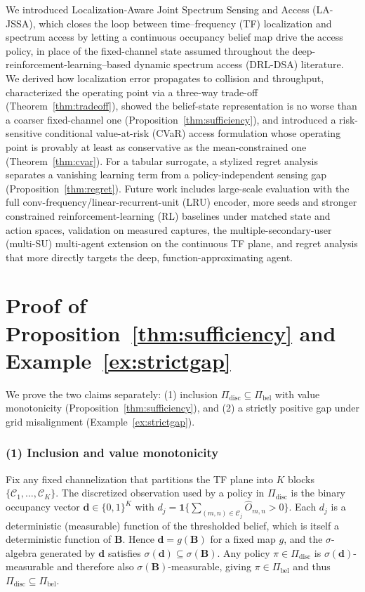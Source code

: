 \documentclass[journal]{IEEEtran}
\newcommand{\Ind}{\mathbf{1}}             %
\newcommand{\cell}{(m,n)}                  %
\newcommand{\occ}{O}                       %
\newcommand{\belmap}{\bm{B}}               %
\newcommand{\pol}{\pi}                     %
\newcommand{\PIbel}{\Pi_{\mathrm{bel}}}    %
\newcommand{\PIdis}{\Pi_{\mathrm{disc}}}   %
\begin{document}
We introduced Localization-Aware Joint Spectrum Sensing and Access (LA-JSSA),
which closes the loop between time--frequency (TF) localization and
spectrum access by letting a continuous occupancy belief map drive the access
policy, in place of the fixed-channel state assumed throughout the
deep-reinforcement-learning--based dynamic spectrum access (DRL-DSA)
literature. We derived how localization error propagates to collision and
throughput, characterized the operating point via a three-way trade-off
(Theorem~\ref{thm:tradeoff}), showed the belief-state representation is no
worse than a coarser fixed-channel one (Proposition~\ref{thm:sufficiency}),
and introduced a risk-sensitive conditional value-at-risk (CVaR) access
formulation whose operating point is provably at least as conservative as the
mean-constrained one
(Theorem~\ref{thm:cvar}). For a tabular surrogate, a stylized regret analysis
separates a vanishing learning term from a policy-independent sensing gap
(Proposition~\ref{thm:regret}). Future work includes large-scale evaluation with
the full conv-frequency/linear-recurrent-unit (LRU) encoder, more seeds and
stronger constrained reinforcement-learning (RL) baselines under matched state
and action spaces, validation on measured captures, the
multiple-secondary-user (multi-SU) multi-agent extension on the continuous TF
plane, and
regret analysis that more directly targets the deep, function-approximating
agent.
\appendices
\section{Proof of Proposition~\ref{thm:sufficiency} and Example~\ref{ex:strictgap}}
\label{sec:appendix_suff}

We prove the two claims separately: (1) inclusion
$\PIdis\subseteq\PIbel$ with value monotonicity
(Proposition~\ref{thm:sufficiency}), and (2) a strictly positive
gap under grid misalignment (Example~\ref{ex:strictgap}).

\subsubsection*{(1) Inclusion and value monotonicity}
Fix any fixed channelization that partitions the TF plane into $K$ blocks
$\{\mathcal{C}_1,\dots,\mathcal{C}_K\}$. The discretized observation used by a
policy in $\PIdis$ is the binary occupancy vector
$\bm{d}\in\{0,1\}^{K}$ with $d_j=\Ind\{\sum_{\cell\in\mathcal{C}_j}
\hat{\occ}_{m,n}>0\}$. Each $d_j$ is a deterministic (measurable) function of
the thresholded belief, which is itself a deterministic function of
$\belmap$. Hence $\bm{d}=g(\belmap)$ for a fixed map $g$, and the
$\sigma$-algebra generated by $\bm{d}$ satisfies
$\sigma(\bm{d})\subseteq\sigma(\belmap)$. Any policy
$\pol\in\PIdis$ is $\sigma(\bm{d})$-measurable and therefore also
$\sigma(\belmap)$-measurable, giving $\pol\in\PIbel$ and thus
$\PIdis\subseteq\PIbel$.
\end{document}
